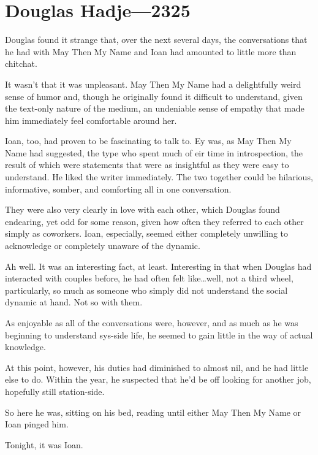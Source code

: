\hypertarget{douglas-hadje-2325}{%
\chapter{Douglas Hadje—2325}\label{douglas-hadje-2325}}

Douglas found it strange that, over the next several days, the conversations that he had with May Then My Name and Ioan had amounted to little more than chitchat.

It wasn't that it was unpleasant. May Then My Name had a delightfully weird sense of humor and, though he originally found it difficult to understand, given the text-only nature of the medium, an undeniable sense of empathy that made him immediately feel comfortable around her.

Ioan, too, had proven to be fascinating to talk to. Ey was, as May Then My Name had suggested, the type who spent much of eir time in introspection, the result of which were statements that were as insightful as they were easy to understand. He liked the writer immediately. The two together could be hilarious, informative, somber, and comforting all in one conversation.

They were also very clearly in love with each other, which Douglas found endearing, yet odd for some reason, given how often they referred to each other simply as coworkers. Ioan, especially, seemed either completely unwilling to acknowledge or completely unaware of the dynamic.

Ah well. It was an interesting fact, at least. Interesting in that when Douglas had interacted with couples before, he had often felt like\ldots well, not a third wheel, particularly, so much as someone who simply did not understand the social dynamic at hand. Not so with them.

As enjoyable as all of the conversations were, however, and as much as he was beginning to understand sys-side life, he seemed to gain little in the way of actual knowledge.

At this point, however, his duties had diminished to almost nil, and he had little else to do. Within the year, he suspected that he'd be off looking for another job, hopefully still station-side.

So here he was, sitting on his bed, reading until either May Then My Name or Ioan pinged him.

Tonight, it was Ioan.

